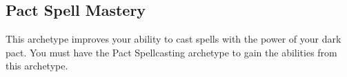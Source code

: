 







    \subsection{Pact Spell Mastery}
        This archetype improves your ability to cast spells with the power of your dark pact.
        You must have the Pact Spellcasting archetype to gain the abilities from this archetype.

